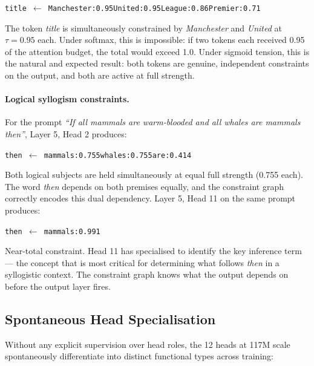 \documentclass[10pt,a4paper]{article}
\begin{document}
\begin{center}
\texttt{title $\leftarrow$ Manchester:0.95\quad United:0.95\quad League:0.86\quad Premier:0.71}
\end{center}

The token \textit{title} is simultaneously constrained by \textit{Manchester} and \textit{United} at $\tau = 0.95$ each. Under softmax, this is impossible: if two tokens each received 0.95 of the attention budget, the total would exceed 1.0. Under sigmoid tension, this is the natural and expected result: both tokens are genuine, independent constraints on the output, and both are active at full strength.

\paragraph{Logical syllogism constraints.} For the prompt \textit{``If all mammals are warm-blooded and all whales are mammals then''}, Layer 5, Head 2 produces:

\begin{center}
\texttt{then $\leftarrow$ mammals:0.755\quad whales:0.755\quad are:0.414}
\end{center}

Both logical subjects are held simultaneously at equal full strength (0.755 each). The word \textit{then} depends on both premises equally, and the constraint graph correctly encodes this dual dependency. Layer 5, Head 11 on the same prompt produces:

\begin{center}
\texttt{then $\leftarrow$ mammals:0.991}
\end{center}

Near-total constraint. Head 11 has specialised to identify the key inference term --- the concept that is most critical for determining what follows \textit{then} in a syllogistic context. The constraint graph knows what the output depends on before the output layer fires.

\subsection{Spontaneous Head Specialisation}

Without any explicit supervision over head roles, the 12 heads at 117M scale spontaneously differentiate into distinct functional types across training:
\end{document}
